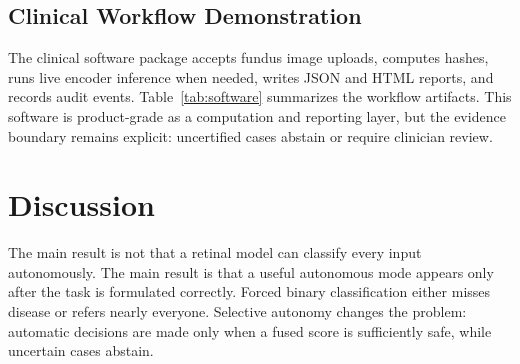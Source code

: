 \documentclass[journal]{IEEEtran}
\begin{document}
\subsection{Clinical Workflow Demonstration}
The clinical software package accepts fundus image uploads, computes hashes, runs live encoder inference when needed, writes JSON and HTML reports, and records audit events. Table~\ref{tab:software} summarizes the workflow artifacts. This software is product-grade as a computation and reporting layer, but the evidence boundary remains explicit: uncertified cases abstain or require clinician review.

\begin{table}[t]
\centering
\caption{Clinical-workflow software artifacts. These checks validate computation and reporting, not regulatory or prospective clinical deployment.}
\label{tab:software}
\end{table}

\section{Discussion}
The main result is not that a retinal model can classify every input autonomously. The main result is that a useful autonomous mode appears only after the task is formulated correctly. Forced binary classification either misses disease or refers nearly everyone. Selective autonomy changes the problem: automatic decisions are made only when a fused score is sufficiently safe, while uncertain cases abstain.
\end{document}

